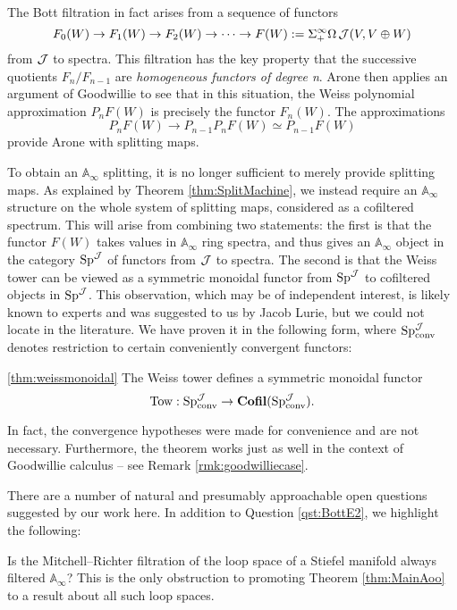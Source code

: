 The Bott filtration in fact arises from a sequence of functors $$F_0(W) \to F_1(W) \to F_2(W) \to \cdots \to F(W) := \Sigma^{\infty}_+ \Omega \operatorname{\mathcal{J}}(V, V\oplus W)$$ from $\operatorname{\mathcal{J}}$ to spectra.  This filtration has the key property that the successive quotients $F_n/F_{n-1}$ are \emph{homogeneous functors of degree n}.  Arone then applies an argument of Goodwillie \cite[Example 1.20]{GoodwillieIII} to see that in this situation, the Weiss polynomial approximation $P_n F(W)$ is precisely the functor $F_n(W)$.  The approximations $$P_n F(W) \rightarrow P_{n-1} P_n F(W) \simeq P_{n-1} F(W)$$ provide Arone with splitting maps.

To obtain an $\mathbb{A}_\infty$ splitting, it is no longer sufficient to merely provide splitting maps.  As explained by Theorem \ref{thm:SplitMachine}, we instead require an $\mathbb{A}_\infty$ structure on the whole system of splitting maps, considered as a cofiltered spectrum.  This will arise from combining two statements: the first is that the functor $F(W)$ takes values in $\mathbb{A}_\infty$ ring spectra, and thus gives an $\mathbb{A}_\infty$ object in the category $\operatorname{\mathrm{Sp}}^{\operatorname{\mathcal{J}}}$ of functors from $\operatorname{\mathcal{J}}$ to spectra.  The second is that the Weiss tower can be viewed as a symmetric monoidal functor from $\operatorname{\mathrm{Sp}}^{\operatorname{\mathcal{J}}}$ to cofiltered objects in $\operatorname{\mathrm{Sp}}^{\operatorname{\mathcal{J}}}$.  This observation, which may be of independent interest, is likely known to experts and was suggested to us by Jacob Lurie, but we could not locate in the literature.  We have proven it in the following form, where $\operatorname{\mathrm{Sp}}^{\operatorname{\mathcal{J}}}_{\text{conv}}$ denotes restriction to certain conveniently convergent functors:
\begin{customthm}{\ref{thm:weissmonoidal}}
The Weiss tower defines a symmetric monoidal functor $$\text{Tow}: \operatorname{\mathrm{Sp}}^{\operatorname{\mathcal{J}}}_{\text{conv}} \to \operatorname{\mathbf{Cofil}}(\operatorname{\mathrm{Sp}}^{\operatorname{\mathcal{J}}}_{\text{conv}}).$$
\end{customthm}
\begin{rmk*}
In fact, the convergence hypotheses were made for convenience and are not necessary.  Furthermore, the theorem works just as well in the context of Goodwillie calculus -- see Remark \ref{rmk:goodwilliecase}.  
\end{rmk*}

There are a number of natural and presumably approachable open questions suggested by our work here.  In addition to Question \ref{qst:BottE2}, we highlight the following:

\begin{qst}
Is the Mitchell--Richter filtration of the loop space of a Stiefel manifold always filtered $\mathbb{A}_\infty$?  This is the only obstruction to promoting Theorem \ref{thm:MainAoo} to a result about all such loop spaces.
\end{qst}

